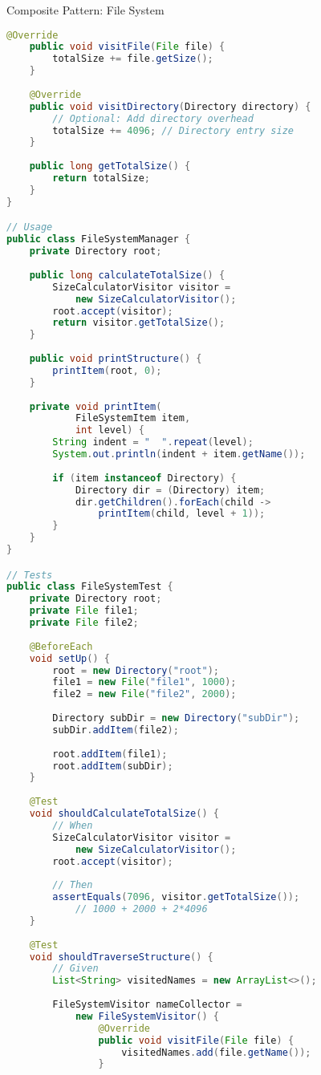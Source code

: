 \begin{example2}[breakable]{Composite Pattern: File System}
\begin{lstlisting}[language=Java, style=basesmol]
    @Override
    public void visitFile(File file) {
        totalSize += file.getSize();
    }
    
    @Override
    public void visitDirectory(Directory directory) {
        // Optional: Add directory overhead
        totalSize += 4096; // Directory entry size
    }
    
    public long getTotalSize() {
        return totalSize;
    }
}

// Usage
public class FileSystemManager {
    private Directory root;
    
    public long calculateTotalSize() {
        SizeCalculatorVisitor visitor = 
            new SizeCalculatorVisitor();
        root.accept(visitor);
        return visitor.getTotalSize();
    }
    
    public void printStructure() {
        printItem(root, 0);
    }
    
    private void printItem(
            FileSystemItem item, 
            int level) {
        String indent = "  ".repeat(level);
        System.out.println(indent + item.getName());
        
        if (item instanceof Directory) {
            Directory dir = (Directory) item;
            dir.getChildren().forEach(child -> 
                printItem(child, level + 1));
        }
    }
}

// Tests
public class FileSystemTest {
    private Directory root;
    private File file1;
    private File file2;
    
    @BeforeEach
    void setUp() {
        root = new Directory("root");
        file1 = new File("file1", 1000);
        file2 = new File("file2", 2000);
        
        Directory subDir = new Directory("subDir");
        subDir.addItem(file2);
        
        root.addItem(file1);
        root.addItem(subDir);
    }
    
    @Test
    void shouldCalculateTotalSize() {
        // When
        SizeCalculatorVisitor visitor = 
            new SizeCalculatorVisitor();
        root.accept(visitor);
        
        // Then
        assertEquals(7096, visitor.getTotalSize()); 
            // 1000 + 2000 + 2*4096
    }
    
    @Test
    void shouldTraverseStructure() {
        // Given
        List<String> visitedNames = new ArrayList<>();
        
        FileSystemVisitor nameCollector = 
            new FileSystemVisitor() {
                @Override
                public void visitFile(File file) {
                    visitedNames.add(file.getName());
                }
                

\end{lstlisting}
\end{example2}
